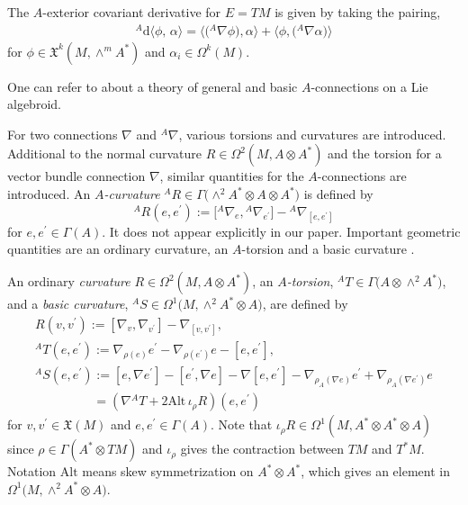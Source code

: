 \documentclass[pdftex]{sigma}
\numberwithin{equation}{section}
\newcommand{\rhoa}{{\rho_A}}
\newcommand{\bracket}[2]{\langle #1,\,#2\rangle}
\newcommand{\rd}{\mathrm{d}}
\newcommand{\baS}{{{}^A S}}
\newcommand{\anabla}{{{}^A \nabla}}
\begin{document}
The $A$-exterior covariant derivative for $E=TM$ is given by
taking the pairing,
\begin{gather*}
{}^A \rd \bracket{\phi}{\alpha} =
\bigl\langle\bigl(\anabla \phi\bigr),\alpha\bigr\rangle
+ \bigl\langle\phi,\bigl(\anabla \alpha\bigr)\bigr\rangle
\end{gather*}
for $\phi \in \mathfrak{X}^k(M, \wedge^m A^*)$
and $\alpha_i \in \Omega^k(M)$.

One can refer to \cite{AbadCrainic, CrainicFernandes, DufourZung}
about a theory of general and basic $A$-connections on a Lie algebroid.


For two connections $\nabla$ and $\anabla$, various torsions and curvatures are introduced.
Additional to the normal curvature $R \in \Omega^2(M, A \otimes A^*)$ and the torsion for a vector bundle connection $\nabla$,
similar quantities for the $A$-connections are introduced.
An \textit{$A$-curvature} ${}^A R \in \Gamma\bigl(\wedge^2 A^* \otimes A \otimes A^*\bigr)$ is defined by
\[%
{}^A R(e, e^{\prime}) := \bigl[{}^A\nabla_e, {}^A\nabla_{e^{\prime}}\bigr] - {}^A\nabla_{[e, e^{\prime}]}
\]
for $e, e^{\prime} \in \Gamma(A)$. It does not appear explicitly in our paper.
Important geometric quantities are an ordinary curvature, an $A$-torsion
and a basic curvature \cite{Blaom}.
\begin{Definition}
An ordinary \textit{curvature} $R \in \Omega^2(M, A \otimes A^*)$,
an \textit{$A$-torsion}, ${}^A T \in \Gamma\bigl(A \otimes \wedge^2 A^*\bigr)$,
and a \textit{basic curvature}, $\baS \in \Omega^1\bigl(M, \wedge^2 A^* \otimes A\bigr)$, are defined by
\begin{gather}%
R(v, v^{\prime}) := [\nabla_v, \nabla_{v^{\prime}}] - \nabla_{[v, v^{\prime}]},\nonumber
\\
{}^A T(e, e^{\prime}) := \nabla_{\rho(e)} e^{\prime} - \nabla_{\rho(e^{\prime})} e
- [e, e^{\prime}],
\label{Etorsion}
\\
\baS(e, e^{\prime}) :=
[e, \nabla e^{\prime}] - [e^{\prime}, \nabla e]
- \nabla[e, e^{\prime}]
- \nabla_{\rhoa(\nabla e)} e^{\prime} + \nabla_{\rhoa(\nabla e^{\prime})} e\nonumber\\
\phantom{\baS(e, e^{\prime})}{}= (\nabla {}^A T + 2 \mathrm{Alt} \, \iota_\rho R)(e, e^{\prime})
\nonumber
\end{gather}
for $v, v^{\prime} \in \mathfrak{X}(M)$ and $e, e^{\prime} \in \Gamma(A)$.
Note that $\iota_\rho R \in \Omega^1(M, A^* \otimes A^* \otimes A)$ since
$\rho \in \Gamma(A^* \otimes TM)$ and $\iota_\rho$ gives the contraction
between $TM$ and $T^*M$. Notation $\mathrm{Alt}$ means skew symmetrization on $A^* \otimes A^*$, which gives an element in $\Omega^1\bigl(M, \wedge^2 A^* \otimes A\bigr)$.
\end{Definition}
\end{document}
